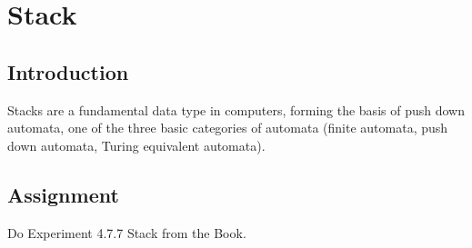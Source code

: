 \chapter{Stack}

\section{Introduction}

Stacks are a fundamental data type in computers, forming the basis of push down automata, one of the three basic categories of automata (finite automata, push down automata, Turing equivalent automata).

\section{Assignment}

Do Experiment 4.7.7 Stack from the Book. 